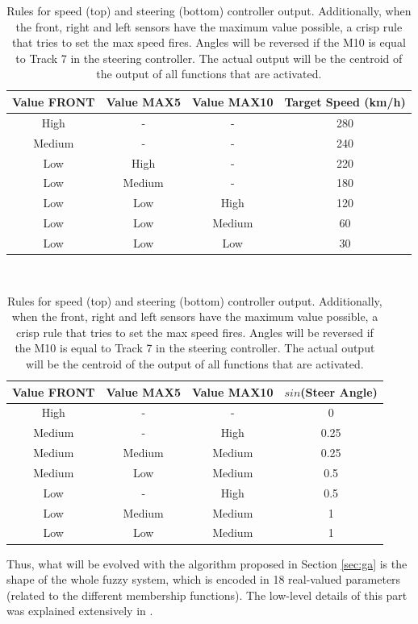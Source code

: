 \documentclass[10pt,journal,compsoc]{IEEEtran}
\begin{document}
\begin{table}[h!tb]
  \centering
  {\scriptsize
    \caption{Rules  \cite{salem_evo18} for speed (top) and steering
      (bottom) controller output. Additionally, when 
      the front, right and left sensors have the maximum value
      possible, a crisp rule that tries to set the max speed
      fires.  Angles will be reversed
      if the M10 is equal to Track 7 in the steering controller. The
      actual output will be the centroid of the output of all functions
      that are activated. \label{tab:output}}
    \begin{tabular}{|c|c|c||c|}
\hline
      Value FRONT & Value MAX5 & Value MAX10 & Target Speed (km/h) \\
      \hline
      High & - & - & 280 \\
      Medium & - & - & 240 \\
      Low & High & - & 220 \\
      Low & Medium & - & 180 \\
      Low & Low & High & 120 \\
      Low & Low & Medium & 60 \\           
      Low & Low & Low & 30 \\     
\hline
\end{tabular}
\vspace{1em} \\
\begin{tabular}{|c|c|c||c|}
\hline
      Value FRONT & Value MAX5 & Value MAX10 & $sin$(Steer Angle) \\
\hline
      High & - & - & 0 \\
      Medium & - & High & 0.25 \\
      Medium & Medium & Medium & 0.25 \\
      Medium & Low & Medium & 0.5 \\
      Low & - & High & 0.5 \\
      Low & Medium & Medium & 1 \\
      Low & Low & Medium & 1 \\ 
      
\hline
\end{tabular}
}
\end{table}



Thus, what will be evolved with the algorithm proposed in Section
\ref{sec:ga} is the shape of the whole fuzzy system, which is encoded
in 18 real-valued parameters (related to the different membership
functions). The low-level details of this part was explained
extensively in \cite{DBLP:conf/cig/SalemMG19}. 
\end{document}
